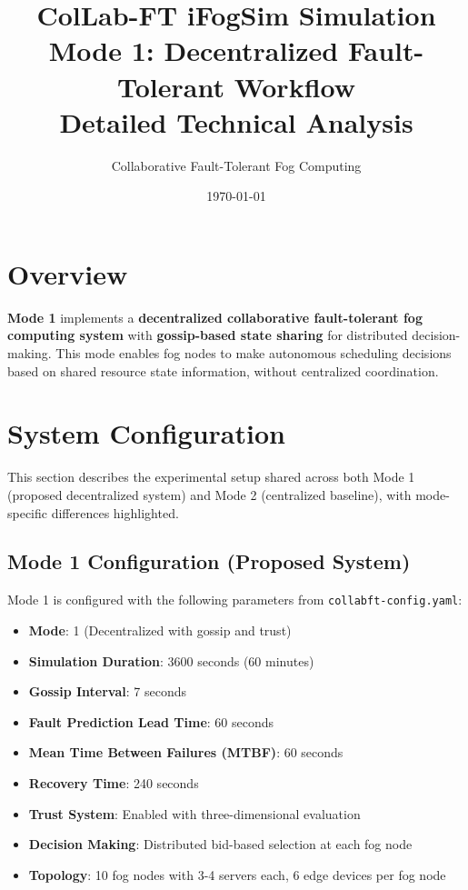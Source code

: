\documentclass[12pt,a4paper]{article}
\title{\textbf{ColLab-FT iFogSim Simulation}\\Mode 1: Decentralized Fault-Tolerant Workflow\\Detailed Technical Analysis}
\author{Collaborative Fault-Tolerant Fog Computing}
\date{\today}
\begin{document}
\maketitle
\setcounter{tocdepth}{3}
\tableofcontents
\clearpage

\section{Overview}

\textbf{Mode 1} implements a \textbf{decentralized collaborative fault-tolerant fog computing system} with \textbf{gossip-based state sharing} for distributed decision-making. This mode enables fog nodes to make autonomous scheduling decisions based on shared resource state information, without centralized coordination.

\section{System Configuration}

This section describes the experimental setup shared across both Mode 1 (proposed decentralized system) and Mode 2 (centralized baseline), with mode-specific differences highlighted.

\subsection{Mode 1 Configuration (Proposed System)}

Mode 1 is configured with the following parameters from \texttt{collabft-config.yaml}:

\begin{itemize}
    \item \textbf{Mode}: 1 (Decentralized with gossip and trust)
    \item \textbf{Simulation Duration}: 3600 seconds (60 minutes)
    \item \textbf{Gossip Interval}: 7 seconds
    \item \textbf{Fault Prediction Lead Time}: 60 seconds
    \item \textbf{Mean Time Between Failures (MTBF)}: 60 seconds
    \item \textbf{Recovery Time}: 240 seconds
    \item \textbf{Trust System}: Enabled with three-dimensional evaluation
    \item \textbf{Decision Making}: Distributed bid-based selection at each fog node
    \item \textbf{Topology}: 10 fog nodes with 3-4 servers each, 6 edge devices per fog node
\end{itemize}
\end{document}
